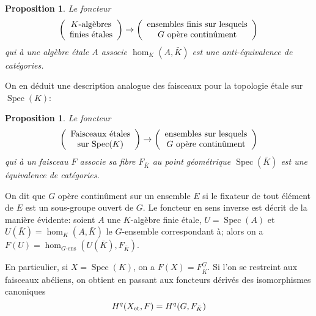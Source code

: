 \documentclass{article}
\DeclareMathOperator{\spec}{Spec}
\newcommand{\et}[1]{{#1}_{\textnormal{et}}}
\newtheorem{proposition}[subsubsection]{Proposition}
\begin{document}
\begin{proposition}\label{2-4-3}
Le foncteur 
\[
  \left(\begin{array}{c}
          \textnormal{$K$-algèbres} \\ 
          \textnormal{finies étales}
        \end{array}\right)
  \to 
  \left(\begin{array}{c}
          \textnormal{ensembles finis sur lesquels} \\
          \textnormal{$G$ opère continûment}
        \end{array}\right)
\]
qui à une algèbre étale $A$ associe $\hom_K(A,\bar K)$ est une 
anti-équivalence de catégories.
\end{proposition}

On en déduit une description analogue des faisceaux pour la topologie étale sur 
$\spec(K)$:





\begin{proposition}\label{2-4-4}
Le foncteur 
\[
  \left(\begin{array}{c}
          \textnormal{Faisceaux étales} \\ 
          \textnormal{sur $\spec(K)$}
        \end{array}\right)
  \to 
  \left(\begin{array}{c}
          \textnormal{ensembles sur lesquels} \\
          \textnormal{$G$ opère continûment}
        \end{array}\right)
\]
qui à un 
faisceau $F$ associe sa fibre $F_{\bar K}$ au point géométrique 
$\spec(\bar K)$ est une équivalence de catégories.
\end{proposition}

On dit que $G$ opère continûment sur un ensemble $E$ si le fixateur de tout 
élément de $E$ est un sous-groupe ouvert de $G$. Le foncteur en sens 
inverse est décrit de la manière évidente: soient $A$ une 
$K$-algèbre finie étale, $U=\spec(A)$ et $U(\bar K)=\hom_K(A,\bar K)$ le 
$G$-ensemble correspondant à; alors on a 
$F(U)= \hom_{G\text{-ens}}(U(\bar K),F_{\bar K})$. 

En particulier, si $X=\spec(K)$, on a $F(X) = F_{\bar K}^G$. Si l'on se 
restreint aux faisceaux abéliens, on obtient en passant aux foncteurs 
dérivés des isomorphismes canoniques 
\[
  H^q(\et X,F) = H^q(G,F_{\bar K})
\]
\end{document}
